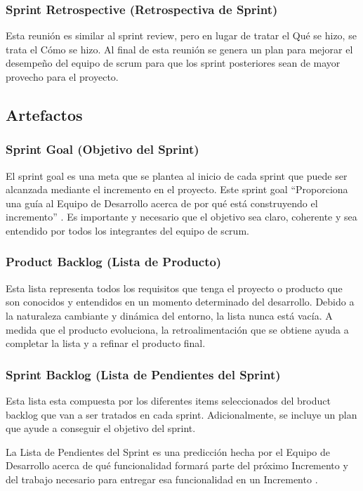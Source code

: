 \subsubsection{Sprint Retrospective (Retrospectiva de Sprint)}

Esta reunión es similar al sprint review, pero en lugar de tratar el Qué se hizo, se trata el Cómo se hizo. Al final de esta reunión se genera un plan para mejorar el desempeño del equipo de scrum para que los sprint posteriores sean de mayor provecho para el proyecto.

\subsection{Artefactos}

\subsubsection{Sprint Goal (Objetivo del Sprint)}

El sprint goal es una meta que se plantea al inicio de cada sprint que puede ser alcanzada mediante el incremento en el proyecto. Este sprint goal ``Proporciona una guía al Equipo de Desarrollo acerca de por qué está construyendo el incremento'' \cite{scrum_guide}. Es importante y necesario que el objetivo sea claro, coherente y sea entendido por todos los integrantes del equipo de scrum.

\subsubsection{Product Backlog (Lista de Producto)}

Esta lista representa todos los requisitos que tenga el proyecto o producto que son conocidos y entendidos en un momento determinado del desarrollo. Debido a la naturaleza cambiante y dinámica del entorno, la lista nunca está vacía. A medida que el producto evoluciona, la retroalimentación que se obtiene ayuda a completar la lista y a refinar el producto final.

\subsubsection{Sprint Backlog (Lista de Pendientes del Sprint)}

Esta lista esta compuesta por los diferentes items seleccionados del broduct backlog que van a ser tratados en cada sprint. Adicionalmente, se incluye un plan que ayude a conseguir el objetivo del sprint.
	
La Lista de Pendientes del Sprint es una predicción hecha por el Equipo de Desarrollo acerca de qué funcionalidad formará parte del próximo Incremento y del trabajo necesario para entregar esa funcionalidad en un Incremento \cite{scrum_guide}.
